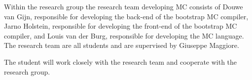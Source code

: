 Within the research group the research team developing MC consists of Douwe van Gijn, responsible for developing the back-end of the bootstrap MC compiler, Jarno Holstein, responsible for developing the front-end of the bootstrap MC compiler, and Louis van der Burg, responsible for developing the MC language.
The research team are all students and are supervised by Giuseppe Maggiore.

The student will work closely with the research team and cooperate with the research group.
